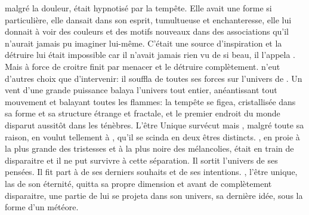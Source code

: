   \Mey malgré la douleur, était hypnotisé par la tempête. Elle avait une forme si particulière, elle dansait dans son esprit, tumultueuse et enchanteresse, elle lui donnait à voir des couleurs et des motifs nouveaux dans des associations qu'il n'aurait jamais pu imaginer lui-même. C'était une source d'inspiration et la détruire lui était impossible car il n'avait jamais rien vu de si beau, il l'appela \Auga. Mais \Auga à force de croitre finit par menacer \Mey et le détruire complètement. \Cind n'eut d'autres choix que d'intervenir: il souffla de toutes ses forces sur l'univers de \Mey. Un vent d'une grande puissance balaya l'univers tout entier, anéantissant tout mouvement et balayant toutes les flammes: la tempête se figea, cristallisée dans sa forme et sa structure étrange et fractale, et le premier endroit du monde disparut aussitôt dans les ténèbres. L'être Unique survécut mais \Mey, malgré toute sa raison, en voulut tellement à \Cind, qu'il se scinda en deux êtres distincts. \Mey, en proie à la plus grande des tristesses et à la plus noire des mélancolies, était en train de disparaitre et il ne put survivre  à cette séparation. Il sortit l'univers de ses pensées. Il fit part à \Cind de ses derniers souhaits et de ses intentions. \Mey, l'être unique, las de son éternité, quitta sa propre dimension et avant de complètement disparaitre, une partie de lui se projeta dans son univers, sa dernière idée, sous la forme d'un météore.
  
  
  
  